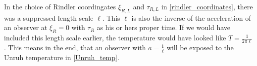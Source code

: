 In the choice of Rindler coordingates $\xi_{R,L}$ and $\tau_{R,L}$ in \eqref{rindler_coordinates}, there was a suppressed length scale $\ell$. This $\ell$ is also the inverse of the acceleration of an observer at $\xi_{R}=0$ with $\tau_R$ as his or hers proper time. If we would have included this length scale earlier, the temperature would have looked like $T=\frac{1}{2\pi \ell}$. This means in the end, that an observer with $a=\frac{1}{\ell}$ will be exposed to the Unruh temperature in \eqref{Unruh_temp}.